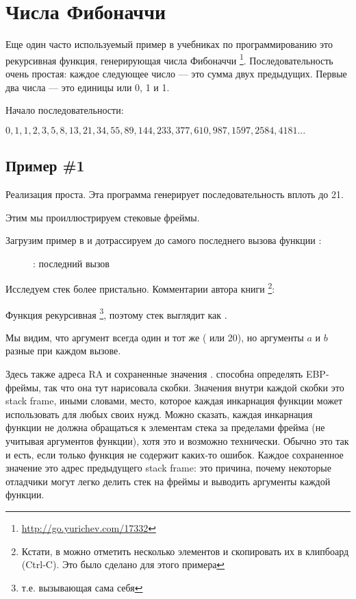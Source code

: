 \section{Числа Фибоначчи}

Еще один часто используемый пример в учебниках по программированию это рекурсивная функция,
генерирующая числа Фибоначчи
\footnote{\url{http://go.yurichev.com/17332}}.
Последовательность очень простая: каждое следующее число --- это сумма двух предыдущих.
Первые два числа --- это единицы или 0, 1 и 1.

Начало последовательности:

\begin{center}
$0, 1, 1, 2, 3, 5, 8, 13, 21, 34, 55, 89, 144, 233, 377, 610, 987, 1597, 2584, 4181 ...$
\end{center}

\subsection{Пример \#1}

Реализация проста. Эта программа генерирует последовательность вплоть до 21.





Этим мы проиллюстрируем стековые фреймы.

\clearpage
Загрузим пример в \olly и дотрассируем до самого последнего вызова функции \ttf{}:

\begin{figure}[H]
\centering
{}
\caption{\olly: последний вызов \ttf{}}
\label{fig:fib_olly}
\end{figure}

\clearpage
Исследуем стек более пристально. 
Комментарии автора книги
\footnote{Кстати, в \olly можно отметить несколько элементов и скопировать их в клипбоард (Ctrl-C).
Это было сделано для этого примера}:



Функция рекурсивная
\footnote{т.е. вызывающая сама себя}, 
поэтому стек выглядит как .

Мы видим, что аргумент  всегда один и тот же ( или 20), но аргументы $a$ и $b$ разные при каждом вызове.

Здесь также адреса \ac{RA} и сохраненные значения \EBP.
\olly способна определять EBP-фреймы, так что она тут нарисовала скобки.
Значения внутри каждой скобки это \gls{stack frame}, иными словами, место, которое каждая
инкарнация функции может использовать для любых своих нужд. 
Можно сказать, каждая инкарнация функции не должна обращаться к элементам стека за пределами
фрейма (не учитывая аргументов функции), хотя это и возможно технически. 
Обычно это так и есть, если только функция не содержит каких-то ошибок.
Каждое сохраненное значение \EBP это адрес предыдущего \gls{stack frame}:
это причина, почему некоторые отладчики могут легко делить стек на фреймы и выводить
аргументы каждой функции.

